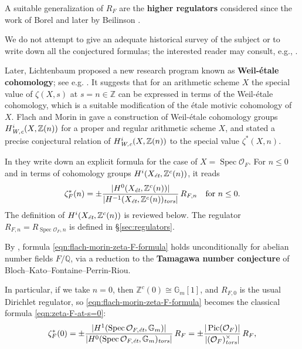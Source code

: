 \documentclass[draft]{article}
\DeclareMathOperator{\Pic}{Pic}
\DeclareMathOperator{\Spec}{Spec}
\newcommand{\QQ}{\mathbb{Q}}
\newcommand{\ZZ}{\mathbb{Z}}
\newcommand{\et}{\text{\it \'{e}t}}
\newcommand{\tors}{\text{\it tors}}
\newcommand{\Wc}{\text{\it W,c}}
\theoremstyle{myplain}
\theoremstyle{mydefinition}
\begin{document}
A suitable generalization of $R_F$ are the \textbf{higher regulators} considered
since the work of Borel \cite{Borel-1977} and later by Beilinson
\cite{Beilinson-1984}.

We do not attempt to give an adequate historical survey of the subject or to
write down all the conjectured formulas; the interested reader may consult,
e.g., \cite{Kolster-2004,Goncharov-2005,Kahn-2005}.

\vspace{1em}

Later, Lichtenbaum proposed a new research program known as
\textbf{Weil-\'{e}tale cohomology}; see e.g.
\cite{Lichtenbaum-2005,Lichtenbaum-2009-Euler-char,Lichtenbaum-2009-number-rings,Lichtenbaum-2021}.
It suggests that for an arithmetic scheme $X$ the special value of $\zeta (X,s)$
at $s = n \in \ZZ$ can be expressed in terms of the Weil-\'{e}tale cohomology,
which is a suitable modification of the \'{e}tale motivic cohomology of $X$.
Flach and Morin in \cite{Flach-Morin-2018} gave a construction of Weil-\'{e}tale
cohomology groups $H^i_\Wc (X,\ZZ(n))$ for a proper and regular arithmetic
scheme $X$, and stated a precise conjectural relation of $H^i_\Wc (X,\ZZ(n))$ to
the special value $\zeta^* (X,n)$.

In \cite[\S 5.8.3]{Flach-Morin-2018} they write down an explicit formula for the
case of $X = \Spec \mathcal{O}_F$. For $n \le 0$ and in terms of cohomology
groups $H^i (X_\et, \ZZ^c (n))$, it reads
\begin{equation}
  \label{eqn:flach-morin-zeta-F-formula}
  \zeta_F^* (n) = \pm\frac{|H^0 (X_\et, \ZZ^c (n))|}{|H^{-1} (X_\et, \ZZ^c (n))_\tors|}\,R_{F,n}
  \quad \text{for }n \le 0.
\end{equation}
The definition of $H^i (X_\et, \ZZ^c (n))$ is reviewed below.
The regulator $R_{F,n} = R_{\Spec \mathcal{O}_F,n}$ is defined in
\S\ref{sec:regulators}.

By \cite[Proposition~5.35]{Flach-Morin-2018}, formula
\eqref{eqn:flach-morin-zeta-F-formula} holds unconditionally for abelian number
fields $F/\QQ$, via a reduction to the \textbf{Tamagawa number conjecture} of
Bloch--Kato--Fontaine--Perrin-Riou.

In particular, if we take $n = 0$, then $\ZZ^c (0) \cong \mathbb{G}_m [1]$, and
$R_{F,0}$ is the usual Dirichlet regulator, so
\eqref{eqn:flach-morin-zeta-F-formula} becomes the classical formula
\eqref{eqn:zeta-F-at-s=0}:
\[ \zeta_F^* (0) =
  \pm \frac{|H^1 (\Spec \mathcal{O}_{F,\et}, \mathbb{G}_m)|}{|H^0 (\Spec \mathcal{O}_{F,\et}, \mathbb{G}_m)_\tors|}\,R_F =
  \pm \frac{|\Pic (\mathcal{O}_F)|}{|(\mathcal{O}_F)^\times_\tors|}\,R_F, \]
\end{document}
